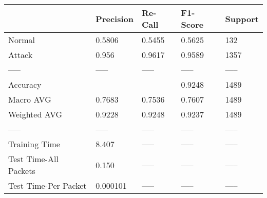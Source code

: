 \begin{tabular}{lllll}
\toprule
{} & Precision & Re-Call & F1-Score & Support \\
\midrule
Normal                &    0.5806 &  0.5455 &   0.5625 &     132 \\
Attack                &     0.956 &  0.9617 &   0.9589 &    1357 \\
-----                 &     ----- &   ----- &    ----- &   ----- \\
Accuracy              &           &         &   0.9248 &    1489 \\
Macro AVG             &    0.7683 &  0.7536 &   0.7607 &    1489 \\
Weighted AVG          &    0.9228 &  0.9248 &   0.9237 &    1489 \\
-----                 &     ----- &   ----- &    ----- &   ----- \\
Training Time         &     8.407 &   ----- &    ----- &   ----- \\
Test Time-All Packets &     0.150 &   ----- &    ----- &   ----- \\
Test Time-Per Packet  &  0.000101 &   ----- &    ----- &   ----- \\
\bottomrule
\end{tabular}
